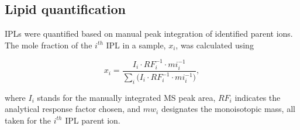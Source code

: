 \subsection{Lipid quantification} IPLs were quantified based on manual peak integration of identified parent ions. The mole fraction of the $i^{th}$ IPL in a sample, $x_{i}$, was calculated using

\begin{equation} \label{eq:IPLquant}
x_{i} = \frac{I_{i} \cdot RF_{i}^{-1} \cdot mi_{i}^{-1}}{\sum_{i} \big(I_{i} \cdot RF_{i}^{-1} \cdot mi_{i}^{-1}\big)},
\end{equation}
 
\noindent where $I_{i}$ stands for the manually integrated MS peak area, $RF_{i}$ indicates the analytical response factor chosen, and $mw_{i}$ designates the monoisotopic mass, all taken for the $i^{th}$ IPL parent ion.

